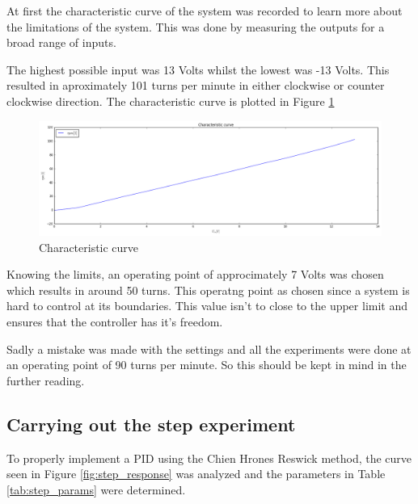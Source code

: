 At first the characteristic curve of the system was recorded to learn more about the limitations of the system. This was done by measuring the outputs for a broad range of inputs.

The highest possible input was 13 Volts whilst the lowest was -13 Volts. This resulted in aproximately 101 turns per minute in either clockwise or counter clockwise direction.
The characteristic curve is plotted in Figure \ref{fig:characteristic_curve}

\begin{figure}[H]
\begin{center}
\includegraphics[width=1\linewidth]{images/general/characteristic_curve}
\end{center}
\caption{Characteristic curve}
\label{fig:characteristic_curve}
\end{figure}

Knowing the limits, an operating point of approcimately 7 Volts was chosen which results in around 50 turns. This operatng point as chosen since a system is hard to control at its boundaries. This value isn't to close to the upper limit and ensures that the controller has it's freedom.

Sadly a mistake was made  with the settings and all the experiments were done at an operating point of 90 turns per minute. So this should be kept in mind in the further reading.

\subsection{Carrying out the step experiment}

To properly implement a PID using the Chien Hrones Reswick method, the curve seen in Figure \ref{fig:step_response} was analyzed and the parameters in Table \ref{tab:step_params} were determined.

